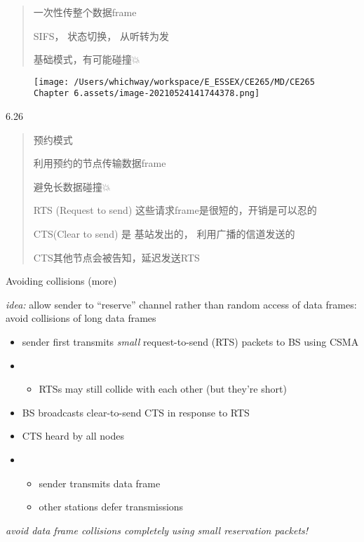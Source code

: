 \documentclass[
]{article}
\begin{document}
\begin{quote}
一次性传整个数据frame

SIFS， 状态切换， 从听转为发

基础模式，有可能碰撞💥
\end{quote}

\begin{figure}
\centering
\texttt{[image: /Users/whichway/workspace/E\_ESSEX/CE265/MD/CE265 Chapter 6.assets/image-20210524141744378.png]}
\caption{}
\end{figure}

6.26

\begin{quote}
预约模式

利用预约的节点传输数据frame

避免长数据碰撞💥

RTS (Request to send) 这些请求frame是很短的，开销是可以忍的

CTS(Clear to send) 是 基站发出的， 利用广播的信道发送的

CTS其他节点会被告知，延迟发送RTS
\end{quote}

Avoiding collisions (more)

\emph{idea:} allow sender to ``reserve'' channel rather than random
access of data frames: avoid collisions of long data frames

\begin{itemize}
\item
  sender first transmits \emph{small} request-to-send (RTS) packets to
  BS using CSMA
\item
  \begin{itemize}
  \item
    RTSs may still collide with each other (but they're short)
  \end{itemize}
\item
  BS broadcasts clear-to-send CTS in response to RTS
\item
  CTS heard by all nodes
\item
  \begin{itemize}
  \item
    sender transmits data frame
  \item
    other stations defer transmissions
  \end{itemize}
\end{itemize}

\emph{avoid data frame collisions completely} \emph{using small
reservation packets!}
\end{document}
